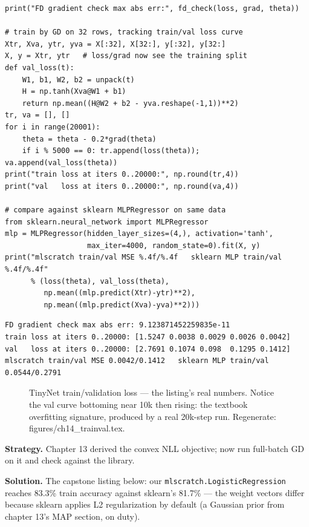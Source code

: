 \begin{lstlisting}[caption={\ttfamily code/ch14\_tinynet.py ---
\texttt{mlscratch.TinyNet}: two-layer net with hand-derived backprop,
gradient-checked, and compared against a library MLP.}]
print("FD gradient check max abs err:", fd_check(loss, grad, theta))

# train by GD on 32 rows, tracking train/val loss curve
Xtr, Xva, ytr, yva = X[:32], X[32:], y[:32], y[32:]
X, y = Xtr, ytr   # loss/grad now see the training split
def val_loss(t):
    W1, b1, W2, b2 = unpack(t)
    H = np.tanh(Xva@W1 + b1)
    return np.mean((H@W2 + b2 - yva.reshape(-1,1))**2)
tr, va = [], []
for i in range(20001):
    theta = theta - 0.2*grad(theta)
    if i % 5000 == 0: tr.append(loss(theta)); va.append(val_loss(theta))
print("train loss at iters 0..20000:", np.round(tr,4))
print("val   loss at iters 0..20000:", np.round(va,4))

# compare against sklearn MLPRegressor on same data
from sklearn.neural_network import MLPRegressor
mlp = MLPRegressor(hidden_layer_sizes=(4,), activation='tanh',
                   max_iter=4000, random_state=0).fit(X, y)
print("mlscratch train/val MSE %.4f/%.4f   sklearn MLP train/val %.4f/%.4f"
      % (loss(theta), val_loss(theta),
         np.mean((mlp.predict(Xtr)-ytr)**2),
         np.mean((mlp.predict(Xva)-yva)**2)))
\end{lstlisting}

\begin{lstlisting}[caption={Output of the TinyNet run. Notice two
headlines: the hand gradient passes the FD check to $10^{-11}$, and the
validation curve turns UP at 15k iterations --- overfitting watched
live, not asserted.}]
FD gradient check max abs err: 9.123871452259835e-11
train loss at iters 0..20000: [1.5247 0.0038 0.0029 0.0026 0.0042]
val   loss at iters 0..20000: [2.7691 0.1074 0.098  0.1295 0.1412]
mlscratch train/val MSE 0.0042/0.1412   sklearn MLP train/val 0.0544/0.2791
\end{lstlisting}

\begin{figure}[htbp]
\centering

\caption{TinyNet train/validation loss --- the listing's real numbers.
Notice the val curve bottoming near 10k then rising: the textbook
overfitting signature, produced by a real 20k-step run. Regenerate:
\ttfamily figures/ch14\_trainval.tex.}
\label{fig:trainval}
\end{figure}

\begin{example}\label{ex:logitgd}
\textbf{Strategy.} Chapter 13 derived the convex NLL objective; now run
full-batch GD on it and check against the library.

\textbf{Solution.} The capstone listing below: our
\texttt{mlscratch.LogisticRegression} reaches 83.3\% train accuracy
against sklearn's 81.7\% --- the weight vectors differ because sklearn
applies L2 regularization by default (a Gaussian prior from
chapter 13's MAP section, on duty).
\end{example}

